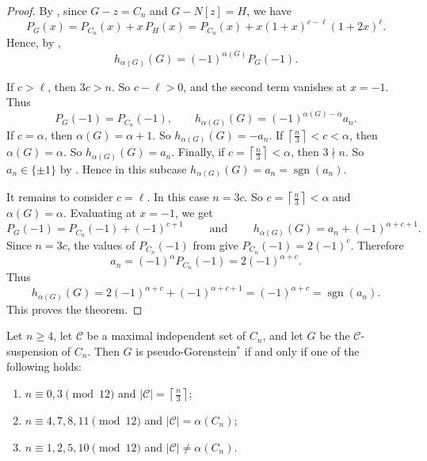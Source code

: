 \documentclass[12pt]{amsart}
\theoremstyle{plain}
\theoremstyle{definition}
\begin{document}
\begin{proof}
By , since \(G-z=C_n\) and \(G-N[z]=H\), we have
\[
P_G(x)=P_{C_n}(x)+x\,P_H(x)
      =P_{C_n}(x)+x(1+x)^{c-\ell}(1+2x)^{\ell}.
\]
Hence, by ,
\[
h_{\alpha(G)}(G)=(-1)^{\alpha(G)}P_G(-1).
\]

If \(c>\ell\), then \(3c>n\). So \(c-\ell>0\), and the second term vanishes at
\(x=-1\). Thus
\[
P_G(-1)=P_{C_n}(-1),
\qquad
h_{\alpha(G)}(G)=(-1)^{\alpha(G)-\alpha}a_n.
\]
If \(c=\alpha\), then \(\alpha(G)=\alpha+1\). So \(h_{\alpha(G)}(G)=-a_n\).
If \(\left\lceil \frac n3\right\rceil<c<\alpha\), then \(\alpha(G)=\alpha\). So
\(h_{\alpha(G)}(G)=a_n\).
Finally, if \(c=\left\lceil \frac n3\right\rceil<\alpha\), then \(3\nmid n\). So
\(a_n\in\{\pm1\}\) by . Hence in this subcase
\(h_{\alpha(G)}(G)=a_n=\operatorname{sgn}(a_n)\).

It remains to consider \(c=\ell\). In this case \(n=3c\). So \(c=\left\lceil \frac n3\right\rceil<\alpha\)
and \(\alpha(G)=\alpha\). Evaluating at \(x=-1\), we get
\[
P_G(-1)=P_{C_n}(-1)+(-1)^{c+1} \qquad \text{ and } \qquad
h_{\alpha(G)}(G)=a_n+(-1)^{\alpha+c+1}.
\]
Since \(n=3c\), the values of \(P_{C_n}(-1)\) from  give \(P_{C_n}(-1)=2(-1)^c\). Therefore
\[
a_n=(-1)^{\alpha}P_{C_n}(-1)=2(-1)^{\alpha+c}.
\]
Thus
\[
h_{\alpha(G)}(G)
=
2(-1)^{\alpha+c}+(-1)^{\alpha+c+1}
=
(-1)^{\alpha+c}
=
\operatorname{sgn}(a_n).
\]
This proves the theorem.
\end{proof}

\begin{cor}
Let \(n\ge 4\), let \(\mathcal C\) be a maximal independent set of \(C_n\), and
let \(G\) be the \(\mathcal C\)-suspension of \(C_n\). Then \(G\) is
pseudo-Gorenstein\(^{*}\) if and only if one of the following holds:
\begin{enumerate}
\item[(a)] \(n\equiv 0,3 \pmod{12}\) and \(|\mathcal C|=\left\lceil \frac n3\right\rceil\);
\item[(b)] \(n\equiv 4,7,8,11 \pmod{12}\) and \(|\mathcal C|=\alpha(C_n)\);
\item[(c)] \(n\equiv 1,2,5,10 \pmod{12}\) and \(|\mathcal C|\ne \alpha(C_n)\).
\end{enumerate}
\end{cor}
\end{document}

